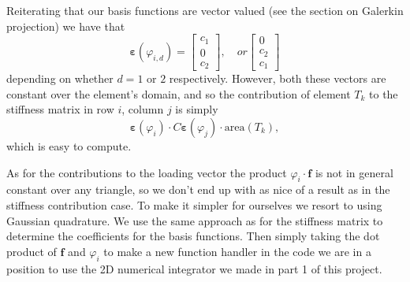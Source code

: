 \documentclass[paper=a4, fontsize=11pt]{scrartcl} %
\begin{document}
Reiterating that our basis functions are vector valued (see the section on Galerkin projection) we have that
\begin{equation*}
\boldsymbol{\varepsilon}\left(\varphi_{\hat{i},d}\right) = \begin{bmatrix}
c_1 \\ 0 \\ c_2
\end{bmatrix}
, \quad or \begin{bmatrix}
0 \\ c_2 \\ c_1
\end{bmatrix}
\end{equation*}
depending on whether $d=1$ or $2$ respectively. However, both these vectors are constant over the element's domain, and so the contribution of element $T_k$ to the stiffness matrix in row $i$, column $j$ is simply
\begin{equation*}
\boldsymbol{\varepsilon}(\varphi_i)\cdot C \boldsymbol{\varepsilon}(\varphi_j)\cdot \text{area}(T_k),
\end{equation*}
which is easy to compute.

As for the contributions to the loading vector the product $\varphi_i\cdot \boldsymbol{f}$ is not in general constant over any triangle, so we don't end up with as nice of a result as in the stiffness contribution case. To make it simpler for ourselves we resort to using Gaussian quadrature. We use the same approach as for the stiffness matrix to determine the coefficients for the basis functions. Then simply taking the dot product of $\boldsymbol{f}$ and $\varphi_i$ to make a new function handler in the code we are in a position to use the 2D numerical integrator we made in part 1 of this project.
\end{document}
